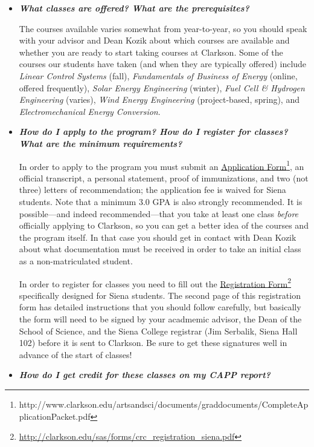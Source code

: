 \documentclass[12pt]{article}
\begin{document}
\begin{itemize}
\item{{\bf {\em What classes are offered?  What are the prerequisites?}}

The courses available varies somewhat from year-to-year, so you should speak
with your advisor and Dean Kozik about which courses are available and whether
you are ready to start taking courses at Clarkson.  Some of the courses our
students have taken (and when they are typically offered) include {\em Linear
  Control Systems} (fall), {\em Fundamentals of Business of Energy} (online,
offered frequently), {\em Solar Energy Engineering} (winter), {\em Fuel Cell \&
  Hydrogen Engineering} (varies), {\em Wind Energy Engineering} (project-based,
spring), and {\em Electromechanical Energy Conversion}.}

\item{{\bf {\em How do I apply to the program?  How do I register for classes?
      What are the minimum requirements?}}

In order to apply to the program you must submit an \underline{Application
  Form}\footnote{http://www.clarkson.edu/artsandsci/documents/graddocuments/CompleteApplicationPacket.pdf},
an official transcript, a personal statement, proof of immunizations, and two
(not three) letters of recommendation; the application fee is waived for Siena
students.  Note that a minimum 3.0 GPA is also strongly recommended.  It is
possible---and indeed recommended---that you take at least one class
\emph{before} officially applying to Clarkson, so you can get a better idea of
the courses and the program itself.  In that case you should get in contact with
Dean Kozik about what documentation must be received in order to take an initial
class as a non-matriculated student.

In order to register for classes you need to fill out the
\underline{Registration
  Form}\footnote{\url{http://clarkson.edu/sas/forms/crc_registration_siena.pdf}}
specifically designed for Siena students.  The second page of this registration
form has detailed instructions that you should follow carefully, but basically
the form will need to be signed by your acadmemic advisor, the Dean of the
School of Science, and the Siena College registrar (Jim Serbalik, Siena Hall
102) before it is sent to Clarkson.  Be sure to get these signatures well in
advance of the start of classes!}

\item{{\bf {\em How do I get credit for these classes on my CAPP report?}}

}
\end{itemize}
\end{document}
